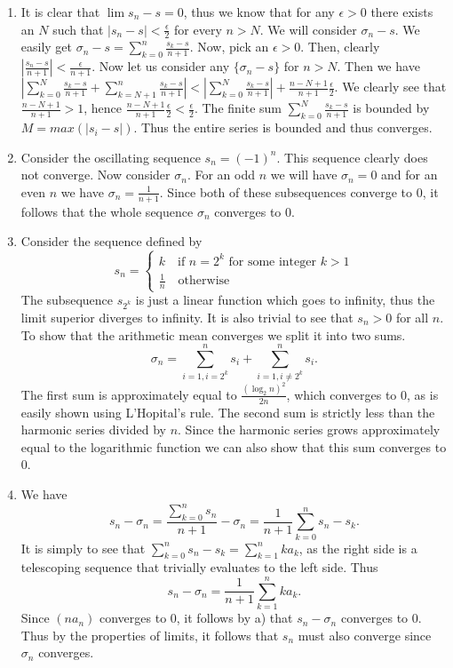 \begin{solution}
  \begin{enumerate}[label=(\alph*)]
    \item It is clear that $\lim s_n - s = 0$, thus we know that for any $\epsilon > 0$ there exists an $N$ such that $|s_n - s| < \frac{\epsilon}{2}$ for every $n > N$.
      We will consider $\sigma_n - s$.
      We easily get $\sigma_n - s = \sum_{k = 0}^{n} \frac{s_k - s}{n + 1}$.
      Now, pick an $\epsilon > 0$.
      Then, clearly $|\frac{s_n - s}{n + 1}| < \frac{\epsilon}{n + 1}$.
      Now let us consider any $\{\sigma_n - s\}$ for $n > N$.
      Then we have $|\sum_{k = 0}^{N} \frac{s_k - s}{n + 1} + \sum_{k = N + 1}^{n} \frac{s_k - s}{n + 1}| < |\sum_{k = 0}^{N} \frac{s_k - s}{n + 1}| + \frac{n - N + 1}{n + 1} \frac{\epsilon}{2}$.
      We clearly see that $\frac{n - N + 1}{n + 1} > 1$, hence $\frac{n - N + 1}{n + 1} \frac{\epsilon}{2} < \frac{\epsilon}{2}$.
      The finite sum $\sum_{k = 0}^{N} \frac{s_k - s}{n + 1}$ is bounded by $M = max(|s_i - s|)$.
      Thus the entire series is bounded and thus converges.
    \item Consider the oscillating sequence $s_n = (-1)^n$.
      This sequence clearly does not converge.
      Now consider $\sigma_n$.
      For an odd $n$ we will have $\sigma_n = 0$ and for an even $n$ we have $\sigma_n = \frac{1}{n + 1}$.
      Since both of these subsequences converge to $0$, it follows that the whole sequence $\sigma_n$ converges to $0$.
    \item Consider the sequence defined by 
      \[s_n = \begin{cases}
      k \quad \text{if } n = 2^k \text{ for some integer } k > 1\\
      \frac{1}{n} \quad \text{otherwise}
      \end{cases}\]
      The subsequence $s_{2^k}$ is just a linear function which goes to infinity, thus the limit superior diverges to infinity.
      It is also trivial to see that $s_n > 0$ for all $n$.
      To show that the arithmetic mean converges we split it into two sums.
      \[\sigma_n = \sum_{i = 1, i = 2^k}^{n} s_i + \sum_{i = 1, i \neq 2^k}^{n} s_i.\]
      The first sum is approximately equal to $\frac{(\log_2 n)^2}{2n}$, which converges to $0$, as is easily shown using L'Hopital's rule.
      The second sum is strictly less than the harmonic series divided by $n$.
      Since the harmonic series grows approximately equal to the logarithmic function we can also show that this sum converges to $0$.
    \item We have
      \[s_n - \sigma_n = \frac{\sum_{k = 0}^{n} s_n}{n + 1} - \sigma_n = \frac{1}{n + 1} \sum_{k = 0}^{n} s_n - s_k.\]
      It is simply to see that $\sum_{k = 0}^{n} s_n - s_k = \sum_{k = 1}^{n} k a_k$, as the right side is a telescoping sequence that trivially evaluates to the left side.
      Thus
      \[s_n - \sigma_n = \frac{1}{n + 1} \sum_{k = 1}^{n} k a_k.\] 
      Since $(n a_n)$ converges to $0$, it follows by a) that $s_n - \sigma_n$ converges to $0$.
      Thus by the properties of limits, it follows that $s_n$ must also converge since $\sigma_n$ converges.
  \end{enumerate}
\end{solution}

